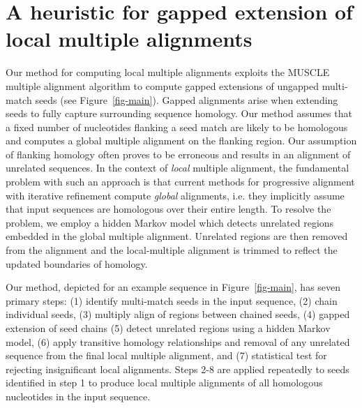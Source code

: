 \documentclass[10pt,journal,letterpaper,compsoc,peerreview]{IEEEtran}
\begin{document}
\section{A heuristic for gapped extension of local multiple alignments}
Our method for computing local multiple alignments exploits the MUSCLE
multiple alignment algorithm to compute gapped extensions of ungapped
multi-match seeds (see Figure~\ref{fig-main}). Gapped alignments arise
when extending seeds to fully capture surrounding sequence
homology. Our method assumes that a fixed number of nucleotides
flanking a seed match are likely to be homologous and computes a
global multiple alignment on the flanking region.  Our assumption of
flanking homology often proves to be erroneous and results in an
alignment of unrelated sequences.  In the context of \textit{local}
multiple alignment, the fundamental problem with such an approach is
that current methods for progressive alignment with iterative
refinement compute \textit{global} alignments, i.e. they implicitly
assume that input sequences are homologous over their entire length.
To resolve the problem, we employ a hidden Markov model which detects
unrelated regions embedded in the global multiple alignment.
Unrelated regions are then removed from the alignment and the
local-multiple alignment is trimmed to reflect the updated boundaries
of homology.

Our method, depicted for an example sequence in
Figure~\ref{fig-main}, has seven primary steps: (1) identify
multi-match seeds in the input sequence, (2) chain individual
seeds, (3) multiply align of regions between chained seeds, (4)
gapped extension of seed chains (5) detect unrelated regions
using a hidden Markov model, (6) apply transitive homology
relationships and removal of any unrelated sequence from
the final local multiple alignment, and (7) statistical test for rejecting
insignificant local alignments.  Steps 2-8 are applied
repeatedly to seeds identified in step 1 to produce local multiple
alignments of all homologous nucleotides in the input sequence.
\end{document}
